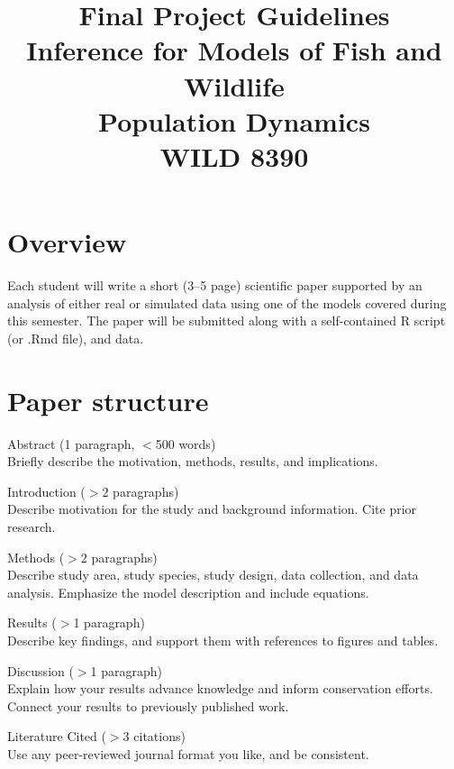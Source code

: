 \documentclass[12pt]{article}
\title{Final Project Guidelines \\ %
  Inference for Models of Fish and Wildlife \\ Population Dynamics \\ WILD 8390}
\date{}
\begin{document}
\maketitle

\vspace{-48pt}

\section*{Overview}

Each student will write a short (3--5 page) scientific paper supported by
an analysis of either real or simulated data using one of the models
covered during this semester. The paper will be submitted
along with a self-contained R script (or .Rmd file), and data.


\section*{Paper structure}

Abstract (1 paragraph, $<$500 words) \\
Briefly describe the motivation, methods, results, and
implications. %
\vspace{6pt}

Introduction ($>$2 paragraphs) \\
Describe motivation for the study and background information. Cite
prior research. 
\vspace{6pt}

Methods  ($>$2 paragraphs) \\
Describe study area, study species, study design, data collection, and
data analysis. Emphasize the model description and include equations.
\vspace{6pt}

Results  ($>$1 paragraph) \\
Describe key findings, and support them with references to figures and tables.
\vspace{6pt}

Discussion  ($>$1 paragraph) \\
Explain how your results advance knowledge and inform conservation
efforts. Connect your results to previously published work.
\vspace{6pt}

Literature Cited  ($>$3 citations) \\
Use any peer-reviewed journal format you like, and be consistent.
\end{document}
